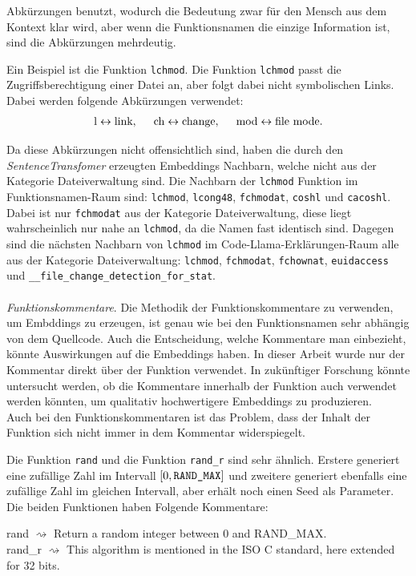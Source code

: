 \documentclass[12pt,letterpaper,ngerman]{article}
\begin{document}
Abkürzungen benutzt, wodurch die Bedeutung zwar für den Mensch 
aus dem Kontext klar wird, aber wenn die Funktionsnamen 
die einzige Information ist, sind die Abkürzungen mehrdeutig.
\begin{example}
  Ein Beispiel ist die Funktion
  \verb|lchmod|. Die Funktion \verb|lchmod| passt die
  Zugriffsberechtigung einer Datei an, aber folgt dabei nicht
  symbolischen Links. Dabei werden folgende Abkürzungen verwendet:
  \begin{align*}
    \text{l} \leftrightarrow \text{link}, \hspace{0.5cm}
    \text{ch} \leftrightarrow \text{change},\hspace{0.5cm}
    \text{mod} \leftrightarrow \text{file mode}.
  \end{align*}
\end{example}
Da diese Abkürzungen nicht offensichtlich sind,
haben die durch den \textit{SentenceTransfomer} 
erzeugten Embeddings Nachbarn, welche nicht aus 
der Kategorie Dateiverwaltung sind. Die Nachbarn 
der \texttt{lchmod} Funktion im Funktionsnamen-Raum
sind: \texttt{lchmod}, \texttt{lcong48}, 
\texttt{fchmodat}, \texttt{coshl} und \texttt{cacoshl}. 
Dabei ist nur \texttt{fchmodat} aus der Kategorie 
Dateiverwaltung, diese liegt wahrscheinlich nur 
nahe an \texttt{lchmod},
da die Namen fast identisch sind. Dagegen sind die 
nächsten Nachbarn von \texttt{lchmod} im 
Code-Llama-Erklärungen-Raum alle aus der 
Kategorie Dateiverwaltung: 
\texttt{lchmod}, \texttt{fchmodat}, \texttt{fchownat},
\texttt{euidaccess} und
\texttt{\_\_file\_change\_detection\_for\_stat}.\\\\
\textit{Funktionskommentare}. 
Die Methodik der 
Funktionskommentare zu verwenden, um Embddings zu erzeugen,
ist genau wie bei den Funktionsnamen sehr abhängig von dem
Quellcode. Auch die Entscheidung, welche Kommentare man 
einbezieht, könnte Auswirkungen auf die Embeddings haben.
In dieser Arbeit wurde nur der Kommentar direkt über der 
Funktion verwendet. In zukünftiger Forschung könnte untersucht 
werden, ob die Kommentare innerhalb der Funktion auch verwendet 
werden könnten, um qualitativ hochwertigere Embeddings zu 
produzieren.\\
Auch bei den Funktionskommentaren ist das Problem, dass der 
Inhalt der Funktion sich nicht immer in dem Kommentar
widerspiegelt.
\begin{example}
  Die Funktion \verb|rand| und die Funktion \verb|rand_r| sind 
  sehr ähnlich. Erstere generiert eine zufällige Zahl im 
  Intervall $[0, \verb|RAND_MAX|]$ und zweitere generiert 
  ebenfalls eine zufällige Zahl im gleichen Intervall, aber
  erhält noch einen Seed als Parameter. Die beiden Funktionen
  haben Folgende Kommentare:
  \begin{center}
    rand $\rightsquigarrow$ Return a random integer between 0
      and RAND\_MAX.\\
    rand\_r  $\rightsquigarrow$   This algorithm is mentioned in 
    the ISO C standard, here extended for 32 bits.
  \end{center}
\end{example}
\end{document}
